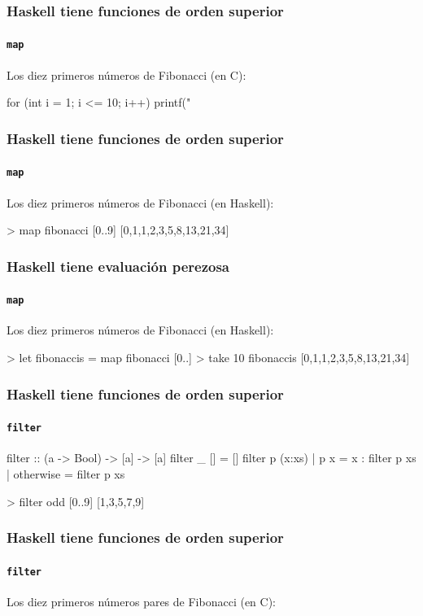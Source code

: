 \documentclass[spanish]{beamer}
\begin{document}

\begin{frame}[fragile]
  \frametitle{Haskell tiene funciones de orden superior}
  \framesubtitle{\texttt{map}}

  Los diez primeros números de Fibonacci (en C):
  \begin{code}
for (int i = 1; i <= 10; i++) {
  printf("%
}
  \end{code}
\end{frame}


\begin{frame}[fragile]
  \frametitle{Haskell tiene funciones de orden superior}
  \framesubtitle{\texttt{map}}

  Los diez primeros números de Fibonacci (en Haskell):
  \begin{code}
> map fibonacci [0..9]
[0,1,1,2,3,5,8,13,21,34]
  \end{code}
\end{frame}


\begin{frame}[fragile]
  \frametitle{Haskell tiene evaluación perezosa}
  \framesubtitle{\texttt{map}}

  Los diez primeros números de Fibonacci (en Haskell):
  \begin{code}
> let fibonaccis = map fibonacci [0..]
> take 10 fibonaccis
[0,1,1,2,3,5,8,13,21,34]
  \end{code}
\end{frame}


\begin{frame}[fragile]
  \frametitle{Haskell tiene funciones de orden superior}
  \framesubtitle{\texttt{filter}}

  \begin{code}
filter :: (a -> Bool) -> [a] -> [a]
filter _ []     = []
filter p (x:xs)
  | p x         = x : filter p xs
  | otherwise   = filter p xs
  \end{code}

  \begin{code}
> filter odd [0..9]
[1,3,5,7,9]
  \end{code}
\end{frame}


\begin{frame}[fragile]
  \frametitle{Haskell tiene funciones de orden superior}
  \framesubtitle{\texttt{filter}}

  Los diez primeros números pares de Fibonacci (en C):
\end{frame}
\end{document}
